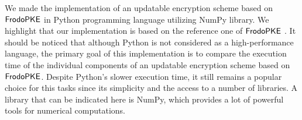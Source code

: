 \documentclass{fundam}
\begin{document}
\begin{table}[ht]
\end{table}



 We made the implementation of an updatable encryption scheme based on $\mathsf{FrodoPKE}$ in Python programming language utilizing NumPy library. We highlight that our implementation is based on the reference one of $\mathsf{FrodoPKE}$ . 
It should be noticed that although Python is not considered as a high-performance language, the primary goal of this implementation is to compare the execution time of the individual components of an updatable encryption scheme based on $\mathsf{FrodoPKE}$. Despite Python's slower execution time, it still remains a popular choice for this tasks since its simplicity and the access to a number of libraries. A library that can be indicated here is NumPy, which provides a lot of powerful tools for numerical computations. 
\end{document}
